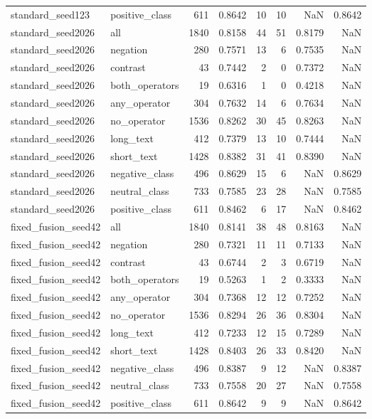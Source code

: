 \begin{tabular}{llrrrrrr}
standard\_seed123 & positive\_class & 611 & 0.8642 & 10 & 10 & NaN & 0.8642 \\
standard\_seed2026 & all & 1840 & 0.8158 & 44 & 51 & 0.8179 & NaN \\
standard\_seed2026 & negation & 280 & 0.7571 & 13 & 6 & 0.7535 & NaN \\
standard\_seed2026 & contrast & 43 & 0.7442 & 2 & 0 & 0.7372 & NaN \\
standard\_seed2026 & both\_operators & 19 & 0.6316 & 1 & 0 & 0.4218 & NaN \\
standard\_seed2026 & any\_operator & 304 & 0.7632 & 14 & 6 & 0.7634 & NaN \\
standard\_seed2026 & no\_operator & 1536 & 0.8262 & 30 & 45 & 0.8263 & NaN \\
standard\_seed2026 & long\_text & 412 & 0.7379 & 13 & 10 & 0.7444 & NaN \\
standard\_seed2026 & short\_text & 1428 & 0.8382 & 31 & 41 & 0.8390 & NaN \\
standard\_seed2026 & negative\_class & 496 & 0.8629 & 15 & 6 & NaN & 0.8629 \\
standard\_seed2026 & neutral\_class & 733 & 0.7585 & 23 & 28 & NaN & 0.7585 \\
standard\_seed2026 & positive\_class & 611 & 0.8462 & 6 & 17 & NaN & 0.8462 \\
fixed\_fusion\_seed42 & all & 1840 & 0.8141 & 38 & 48 & 0.8163 & NaN \\
fixed\_fusion\_seed42 & negation & 280 & 0.7321 & 11 & 11 & 0.7133 & NaN \\
fixed\_fusion\_seed42 & contrast & 43 & 0.6744 & 2 & 3 & 0.6719 & NaN \\
fixed\_fusion\_seed42 & both\_operators & 19 & 0.5263 & 1 & 2 & 0.3333 & NaN \\
fixed\_fusion\_seed42 & any\_operator & 304 & 0.7368 & 12 & 12 & 0.7252 & NaN \\
fixed\_fusion\_seed42 & no\_operator & 1536 & 0.8294 & 26 & 36 & 0.8304 & NaN \\
fixed\_fusion\_seed42 & long\_text & 412 & 0.7233 & 12 & 15 & 0.7289 & NaN \\
fixed\_fusion\_seed42 & short\_text & 1428 & 0.8403 & 26 & 33 & 0.8420 & NaN \\
fixed\_fusion\_seed42 & negative\_class & 496 & 0.8387 & 9 & 12 & NaN & 0.8387 \\
fixed\_fusion\_seed42 & neutral\_class & 733 & 0.7558 & 20 & 27 & NaN & 0.7558 \\
fixed\_fusion\_seed42 & positive\_class & 611 & 0.8642 & 9 & 9 & NaN & 0.8642 \\

\end{tabular}
